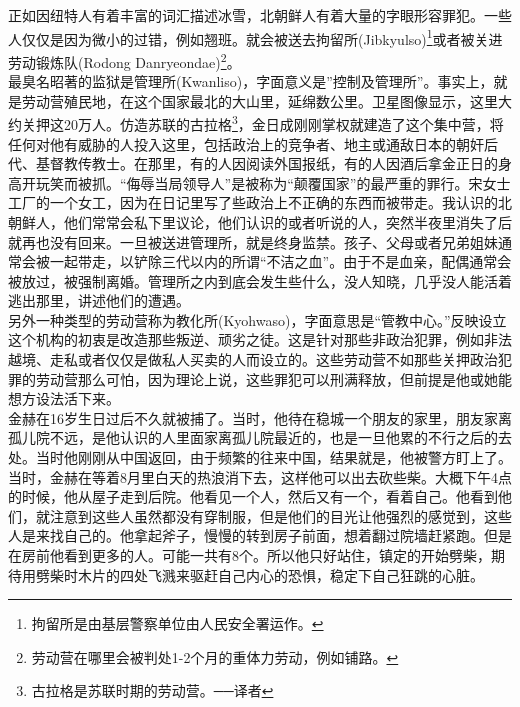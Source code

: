 \ifnum{}
	\begin{multicols}{\theparacolNo}
\fi
正如因纽特人有着丰富的词汇描述冰雪，北朝鲜人有着大量的字眼形容罪犯。一些人仅仅是因为微小的过错，例如翘班。就会被送去拘留所(Jibkyulso)\footnote{拘留所是由基层警察单位由人民安全署运作。}或者被关进劳动锻炼队(Rodong Danryeondae)\footnote{劳动营在哪里会被判处1-2个月的重体力劳动，例如铺路。}。\\

最臭名昭著的监狱是管理所(Kwanliso)，字面意义是”控制及管理所”。事实上，就是劳动营殖民地，在这个国家最北的大山里，延绵数公里。卫星图像显示，这里大约关押这20万人。仿造苏联的古拉格\footnote{古拉格是苏联时期的劳动营。──译者}，金日成刚刚掌权就建造了这个集中营，将任何对他有威胁的人投入这里，包括政治上的竞争者、地主或通敌日本的朝奸后代、基督教传教士。在那里，有的人因阅读外国报纸，有的人因酒后拿金正日的身高开玩笑而被抓。“侮辱当局领导人”是被称为“颠覆国家”的最严重的罪行。宋女士工厂的一个女工，因为在日记里写了些政治上不正确的东西而被带走。我认识的北朝鲜人，他们常常会私下里议论，他们认识的或者听说的人，突然半夜里消失了后就再也没有回来。一旦被送进管理所，就是终身监禁。孩子、父母或者兄弟姐妹通常会被一起带走，以铲除三代以内的所谓“不洁之血”。由于不是血亲，配偶通常会被放过，被强制离婚。管理所之内到底会发生些什么，没人知晓，几乎没人能活着逃出那里，讲述他们的遭遇。\\

另外一种类型的劳动营称为教化所(Kyohwaso)，字面意思是“管教中心。”反映设立这个机构的初衷是改造那些叛逆、顽劣之徒。这是针对那些非政治犯罪，例如非法越境、走私或者仅仅是做私人买卖的人而设立的。这些劳动营不如那些关押政治犯罪的劳动营那么可怕，因为理论上说，这些罪犯可以刑满释放，但前提是他或她能想方设法活下来。\\

金赫在16岁生日过后不久就被捕了。当时，他待在稳城一个朋友的家里，朋友家离孤儿院不远，是他认识的人里面家离孤儿院最近的，也是一旦他累的不行之后的去处。当时他刚刚从中国返回，由于频繁的往来中国，结果就是，他被警方盯上了。\\

当时，金赫在等着8月里白天的热浪消下去，这样他可以出去砍些柴。大概下午4点的时候，他从屋子走到后院。他看见一个人，然后又有一个，看着自己。他看到他们，就注意到这些人虽然都没有穿制服，但是他们的目光让他强烈的感觉到，这些人是来找自己的。他拿起斧子，慢慢的转到房子前面，想着翻过院墙赶紧跑。但是在房前他看到更多的人。可能一共有8个。所以他只好站住，镇定的开始劈柴，期待用劈柴时木片的四处飞溅来驱赶自己内心的恐惧，稳定下自己狂跳的心脏。\\


\end{multicols}
